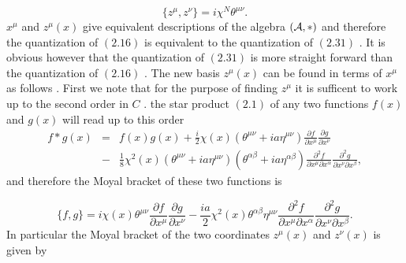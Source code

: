 \documentclass[a4paper,12pt]{article}
\begin{document}
\begin{equation}
\{z^{\mu},z^{\nu}\}=i{\chi}^N{\theta}^{{\mu}{\nu}}.
\end{equation}
$x^{\mu}$ and $z^{\mu}(x)$ give equivalent descriptions of the
algebra $({\cal A},*)$ and therefore the quantization of $(2.16)$
is equivalent to the quantization of $(2.31)$ . It is obvious
however that the quantization of $(2.31)$ is more straight forward
than the quantization of $(2.16)$ . The new basis $z^{\mu}(x)$ can
be found in terms of $x^{\mu}$ as follows . First we note that
for the purpose of finding $z^{\mu}$  it is sufficent to work up
to the second order in $C$ . the star product $(2.1)$ of any two
functions $f(x)$ and $g(x)$ will read up to this order
\begin{eqnarray}
f*g(x)&=&f(x)g(x) + \frac{i}{2}{\chi}(x)({\theta}^{{\mu}{\nu}} + i a {\eta}^{{\mu}{\nu}})\frac{\partial{f}}{\partial{x^{\mu}}}\frac{\partial{g}}{\partial{x^{\nu}}}\nonumber\\
& -& \frac{1}{8}{\chi}^2(x) ({\theta}^{{\mu}{\nu}} + i
a{\eta}^{{\mu}{\nu}}) ({\theta}^{{\alpha}{\beta}} + ia
{\eta}^{{\alpha}{\beta}})
\frac{{\partial}^2{f}}{\partial{x^{\mu}}\partial{x^{\alpha}}}\frac{{\partial}^2{g}}{\partial{x^{\nu}}\partial{x^{\beta}}},
\end{eqnarray}
and therefore the Moyal bracket of these two functions is


\begin{equation}
\{f,g\}= i{\chi}(x){\theta}^{{\mu}{\nu}}
\frac{\partial{f}}{\partial{x^{\mu}}}\frac{\partial{g}}{\partial{x^{\nu}}}
-
\frac{ia}{2}{\chi}^2(x){\theta}^{{\alpha}{\beta}}{\eta}^{{\mu}{\nu}}
\frac{{\partial}^2{f}}{\partial{x^{\mu}}\partial{x^{\alpha}}}\frac{{\partial}^2{g}}{\partial{x^{\nu}}\partial{x^{\beta}}}.
\end{equation}
In particular the Moyal bracket of the two coordinates $z^{\mu}(x)$ and $z^{\nu}(x)$ is given by
\end{document}
